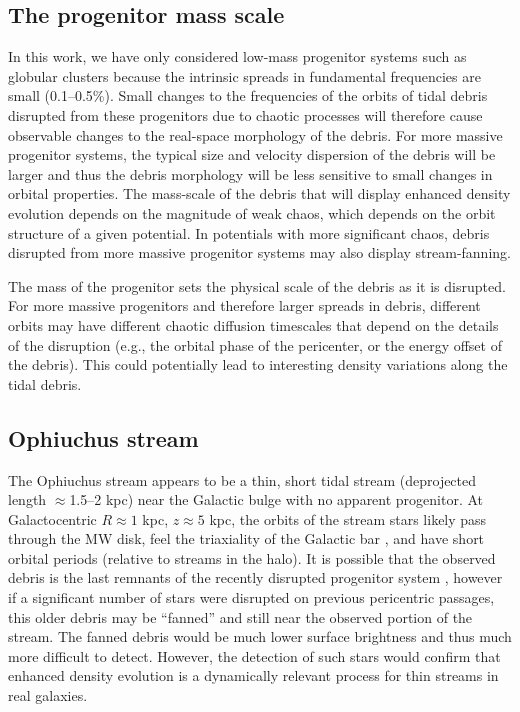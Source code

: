 \documentclass[letterpaper,12pt,preprint]{aastex}
\begin{document}
\subsection{The progenitor mass scale}

In this work, we have only considered low-mass progenitor systems such as globular clusters because the intrinsic spreads in fundamental frequencies are small (0.1--0.5\%). Small changes to the frequencies of the orbits of tidal debris disrupted from these progenitors due to chaotic processes will therefore cause observable changes to the real-space morphology of the debris. For more massive progenitor systems, the typical size and velocity dispersion of the debris will be larger and thus the debris morphology will be less sensitive to small changes in orbital properties. The mass-scale of the debris that will display enhanced density evolution depends on the magnitude of weak chaos, which depends on the orbit structure of a given potential. In potentials with more significant chaos, debris disrupted from more massive progenitor systems may also display stream-fanning.

The mass of the progenitor sets the physical scale of the debris as it is disrupted. For more massive progenitors and therefore larger spreads in debris, different orbits may have different chaotic diffusion timescales that depend on the details of the disruption (e.g., the orbital phase of the pericenter, or the energy offset of the debris). This could potentially lead to interesting density variations along the tidal debris.

\subsection{Ophiuchus stream}

The Ophiuchus stream \citep{bernard14, sesar15} appears to be a thin, short tidal stream (deprojected length $\approx$1.5--2 kpc) near the Galactic bulge with no apparent progenitor. At Galactocentric $R \approx 1$ kpc, $z \approx 5$ kpc, the orbits of the stream stars likely pass through the MW disk, feel the triaxiality of the Galactic bar \citep[e.g.,][]{wegg13, wegg15}, and have short orbital periods (relative to streams in the halo). It is possible that the observed debris is the last remnants of the recently disrupted progenitor system \citep{sesar15}, however if a significant number of stars were disrupted on previous pericentric passages, this older debris may be ``fanned'' and still near the observed portion of the stream. The fanned debris would be much lower surface brightness and thus much more difficult to detect. However, the detection of such stars would confirm that enhanced density evolution is a dynamically relevant process for thin streams in real galaxies.
\end{document}
